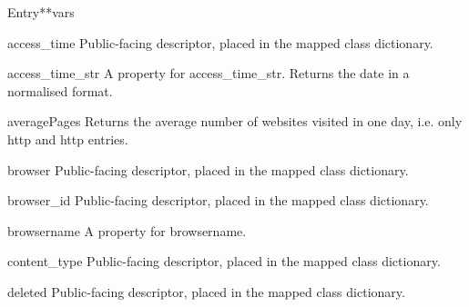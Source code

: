 \documentclass[letterpaper,10pt,english]{manual}
\begin{document}
\begin{classdesc}{Entry}{**vars}
\hypertarget{webscavator.model.models.Entry.access_time}{}\begin{memberdesc}{access\_time}
Public-facing descriptor, placed in the mapped class dictionary.
\end{memberdesc}

\hypertarget{webscavator.model.models.Entry.access_time_str}{}\begin{memberdesc}{access\_time\_str}
A property for access\_time\_str. Returns the date in a normalised format.
\end{memberdesc}

\hypertarget{webscavator.model.models.Entry.averagePages}{}\begin{staticmethoddesc}{averagePages}{}
Returns the average number of websites visited in one day, i.e. only http
and http entries.
\end{staticmethoddesc}

\hypertarget{webscavator.model.models.Entry.browser}{}\begin{memberdesc}{browser}
Public-facing descriptor, placed in the mapped class dictionary.
\end{memberdesc}

\hypertarget{webscavator.model.models.Entry.browser_id}{}\begin{memberdesc}{browser\_id}
Public-facing descriptor, placed in the mapped class dictionary.
\end{memberdesc}

\hypertarget{webscavator.model.models.Entry.browsername}{}\begin{memberdesc}{browsername}
A property for browsername.
\end{memberdesc}

\hypertarget{webscavator.model.models.Entry.content_type}{}\begin{memberdesc}{content\_type}
Public-facing descriptor, placed in the mapped class dictionary.
\end{memberdesc}

\hypertarget{webscavator.model.models.Entry.deleted}{}\begin{memberdesc}{deleted}
Public-facing descriptor, placed in the mapped class dictionary.
\end{memberdesc}


\end{classdesc}
\end{document}
